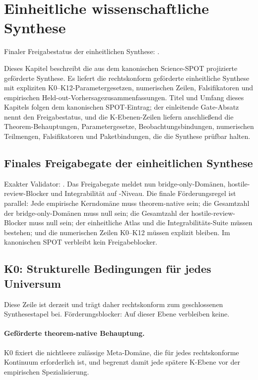 \section{Einheitliche wissenschaftliche Synthese}
\label{sec:oc-core-1-3-unified-synthesis}
Finaler Freigabestatus der einheitlichen Synthese: .

Dieses Kapitel beschreibt die aus dem kanonischen Science-SPOT projizierte geförderte Synthese. Es liefert die rechtskonform geförderte einheitliche Synthese mit expliziten K0--K12-Parametergesetzen, numerischen Zeilen, Falsifikatoren und empirischen Held-out-Vorhersagezusammenfassungen.
Titel und Umfang dieses Kapitels folgen dem kanonischen SPOT-Eintrag; der einleitende Gate-Absatz nennt den Freigabestatus, und die K-Ebenen-Zeilen liefern anschließend die Theorem-Behauptungen, Parametergesetze, Beobachtungsbindungen, numerischen Teilmengen, Falsifikatoren und Paketbindungen, die die Synthese prüfbar halten.

\subsection{Finales Freigabegate der einheitlichen Synthese}
Exakter Validator: .
Das Freigabegate meldet nun  bridge-only-Domänen,  hostile-review-Blocker und Integrabilität auf -Niveau.
Die finale Förderungsregel ist parallel: Jede empirische Kerndomäne muss theorem-native sein; die Gesamtzahl der bridge-only-Domänen muss null sein; die Gesamtzahl der hostile-review-Blocker muss null sein; der einheitliche Atlas und die Integrabilitäts-Suite müssen bestehen; und die numerischen Zeilen K0--K12 müssen explizit bleiben.
Im kanonischen SPOT verbleibt kein Freigabeblocker.

\subsection{K0: Strukturelle Bedingungen für jedes Universum}
\label{sec:oc-core-1-3-synthesis-k0}
Diese Zeile ist derzeit  und trägt daher rechtskonform zum geschlossenen Synthesestapel bei.
Förderungsblocker: Auf dieser Ebene verbleiben keine.

\paragraph{Geförderte theorem-native Behauptung.}
K0 fixiert die nichtleere zulässige Meta-Domäne, die für jedes rechtskonforme Kontinuum erforderlich ist, und begrenzt damit jede spätere K-Ebene vor der empirischen Spezialisierung.

